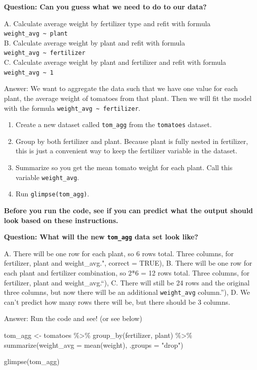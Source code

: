 \documentclass[
  openany]{book}
\newenvironment{Shaded}{\begin{snugshade}}{\end{snugshade}}
\newcommand{\AttributeTok}[1]{\textcolor[rgb]{0.77,0.63,0.00}{#1}}
\newcommand{\FunctionTok}[1]{\textcolor[rgb]{0.00,0.00,0.00}{#1}}
\newcommand{\NormalTok}[1]{#1}
\newcommand{\OtherTok}[1]{\textcolor[rgb]{0.56,0.35,0.01}{#1}}
\newcommand{\SpecialCharTok}[1]{\textcolor[rgb]{0.00,0.00,0.00}{#1}}
\newcommand{\StringTok}[1]{\textcolor[rgb]{0.31,0.60,0.02}{#1}}
\providecommand{\tightlist}{%
  \setlength{\itemsep}{0pt}\setlength{\parskip}{0pt}}
\begin{document}
\textbf{Question: Can you guess what we need to do to our data?}

A. Calculate average weight by fertilizer type and refit with formula \texttt{weight\_avg\ \textasciitilde{}\ plant}\\
B. Calculate average weight by plant and refit with formula \texttt{weight\_avg\ \textasciitilde{}\ fertilizer}\\
C. Calculate average weight by plant and fertilizer and refit with formula \texttt{weight\_avg\ \textasciitilde{}\ 1}

Answer: We want to aggregate the data such that we have one value for each plant, the average weight of tomatoes from that plant. Then we will fit the model with the formula \texttt{weight\_avg\ \textasciitilde{}\ fertilizer}.

\begin{enumerate}
\def\labelenumi{\arabic{enumi}.}
\tightlist
\item
  Create a new dataset called \texttt{tom\_agg} from the \texttt{tomatoes} dataset.
\item
  Group by both fertilizer and plant. Because plant is fully nested in fertilizer, this is just a convenient way to keep the fertilizer variable in the dataset.
\item
  Summarize so you get the mean tomato weight for each plant. Call this variable \texttt{weight\_avg}.
\item
  Run \texttt{glimpse(tom\_agg)}.
\end{enumerate}

\textbf{Before you run the code, see if you can predict what the output should look based on these instructions.}

\textbf{Question: What will the new \texttt{tom\_agg} data set look like?}

A. There will be one row for each plant, so 6 rows total. Three columns, for fertilizer, plant and weight\_avg.", correct = TRUE),
B. There will be one row for each plant and fertilizer combination, so 2*6 = 12 rows total. Three columns, for fertilizer, plant and weight\_avg.``),
C. There will still be 24 rows and the original three columns, but now there will be an additional \texttt{weight\_avg} column.''),
D. We can't predict how many rows there will be, but there should be 3 columns.

Answer: Run the code and see! (or see below)

\begin{Shaded}
\begin{Highlighting}[]
\NormalTok{tom\_agg }\OtherTok{\textless{}{-}}\NormalTok{ tomatoes }\SpecialCharTok{\%\textgreater{}\%} 
  \FunctionTok{group\_by}\NormalTok{(fertilizer, plant) }\SpecialCharTok{\%\textgreater{}\%} 
  \FunctionTok{summarize}\NormalTok{(}\AttributeTok{weight\_avg =} \FunctionTok{mean}\NormalTok{(weight), }\AttributeTok{.groups =} \StringTok{"drop"}\NormalTok{)}

\FunctionTok{glimpse}\NormalTok{(tom\_agg)}
\end{Highlighting}
\end{Shaded}
\end{document}
